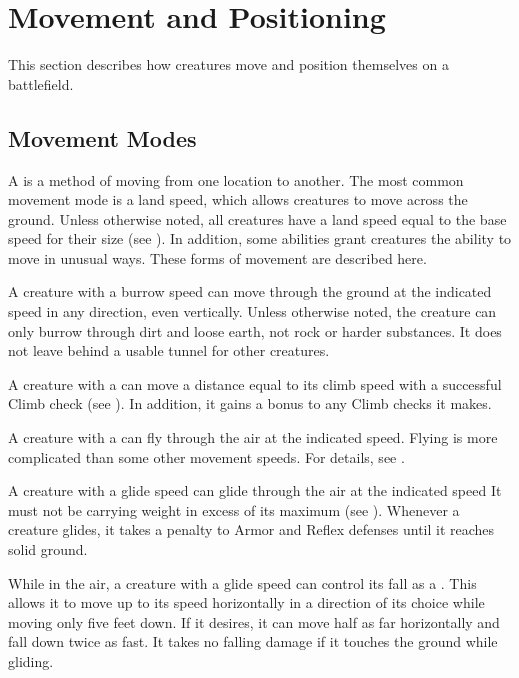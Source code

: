 \section{Movement and Positioning}\label{Movement and Positioning}
    This section describes how creatures move and position themselves on a battlefield.

    \subsection{Movement Modes}\label{Movement Modes}
        A  is a method of moving from one location to another.
        The most common movement mode is a land speed, which allows creatures to move across the ground.
        Unless otherwise noted, all creatures have a land speed equal to the base speed for their size (see ).
        In addition, some abilities grant creatures the ability to move in unusual ways.
        These forms of movement are described here.

        A creature with a burrow speed can move through the ground at the indicated speed in any direction, even vertically. Unless otherwise noted, the creature can only burrow through dirt and loose earth, not rock or harder substances. It does not leave behind a usable tunnel for other creatures.

        A creature with a  can move a distance equal to its climb speed with a successful Climb check (see ).
        In addition, it gains a  bonus to any Climb checks it makes.

        \label{Flying}
        A creature with a  can fly through the air at the indicated speed.
        Flying is more complicated than some other movement speeds.
        For details, see .

        \label{Gliding}
        A creature with a glide speed can glide through the air at the indicated speed
        It must not be carrying weight in excess of its maximum  (see ).
        Whenever a creature glides, it takes a  penalty to Armor and Reflex defenses until it reaches solid ground.

        While in the air, a creature with a glide speed can control its fall as a . This allows it to move up to its speed horizontally in a direction of its choice while moving only five feet down. If it desires, it can move half as far horizontally and fall down twice as fast. It takes no falling damage if it touches the ground while gliding.

